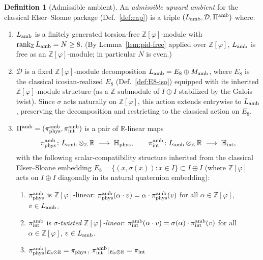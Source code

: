 \documentclass[11pt, a4paper]{amsart}
\theoremstyle{definition}
\newtheorem{definition}[theorem]{Definition}
\newcommand{\R}{\mathbb{R}}
\newcommand{\Z}{\mathbb{Z}}
\newcommand{\HH}{\mathbb{H}}
\newcommand{\rk}{\operatorname{rank}}
\newcommand{\Ophi}{\mathbb{Z}[\varphi]}
\begin{document}
\begin{definition}[Admissible ambient]
\label{def:admissible}
An \emph{admissible upward ambient} for the classical
Elser--Sloane package (Def.~\ref{def:cap}) is a triple
$(L_{\rm amb}, \mathcal{D}, \Pi^{\rm amb})$ where:
\begin{enumerate}
\item[\textup{(A1)}] $L_{\rm amb}$ is a finitely generated
  torsion-free $\Ophi$-module with $\rk_\Z L_{\rm amb} = N
  \geq 8$. (By Lemma~\ref{lem:pid-free} applied over $\Ophi$,
  $L_{\rm amb}$ is free as an $\Ophi$-module; in particular $N$
  is even.)
\item[\textup{(A2)}] $\mathcal{D}$ is a fixed $\Ophi$-module
  decomposition $L_{\rm amb} = E_8 \oplus M_{\rm amb}$, where
  $E_8$ is the classical icosian-realized $E_8$
  (Def.~\ref{def:E8-iso}) equipped with its inherited
  $\Ophi$-module structure (as a $\Z$-submodule of $I \oplus
  I$ stabilized by the Galois twist). Since $\sigma$ acts
  naturally on $\Ophi$, this action extends entrywise to
  $L_{\rm amb}$, preserving the decomposition and restricting
  to the classical action on $E_8$.
\item[\textup{(A3)}] $\Pi^{\rm amb} = (\pi_{\rm phys}^{\rm amb},
  \pi_{\rm int}^{\rm amb})$ is a pair of $\R$-linear maps
  \[
    \pi_{\rm phys}^{\rm amb} \colon L_{\rm amb} \otimes_\Z \R
      \;\longrightarrow\; \HH_{\rm phys},
    \qquad
    \pi_{\rm int}^{\rm amb} \colon L_{\rm amb} \otimes_\Z \R
      \;\longrightarrow\; \HH_{\rm int},
  \]
  with the following scalar-compatibility structure inherited
  from the classical Elser--Sloane embedding $E_8 = \{(x,
  \sigma(x)) : x \in I\} \subset I \oplus I$ (where $\Ophi$
  acts on $I \oplus I$ diagonally in its natural quaternion
  embedding):
  \begin{enumerate}
  \item[\textup{(A3.a)}] $\pi_{\rm phys}^{\rm amb}$ is
    $\Ophi$-linear:
    $\pi_{\rm phys}^{\rm amb}(\alpha \cdot v) = \alpha \cdot
    \pi_{\rm phys}^{\rm amb}(v)$ for all $\alpha \in \Ophi$,
    $v \in L_{\rm amb}$.
  \item[\textup{(A3.b)}] $\pi_{\rm int}^{\rm amb}$ is
    \emph{$\sigma$-twisted $\Ophi$-linear}:
    $\pi_{\rm int}^{\rm amb}(\alpha \cdot v) = \sigma(\alpha)
    \cdot \pi_{\rm int}^{\rm amb}(v)$ for all $\alpha \in
    \Ophi$, $v \in L_{\rm amb}$.
  \item[\textup{(A3.c)}]
    $\pi_{\rm phys}^{\rm amb}|_{E_8 \otimes \R} = \pi_{\rm phys}$,
    $\pi_{\rm int}^{\rm amb}|_{E_8 \otimes \R} = \pi_{\rm int}$

\end{enumerate}
\end{enumerate}
\end{definition}
\end{document}
